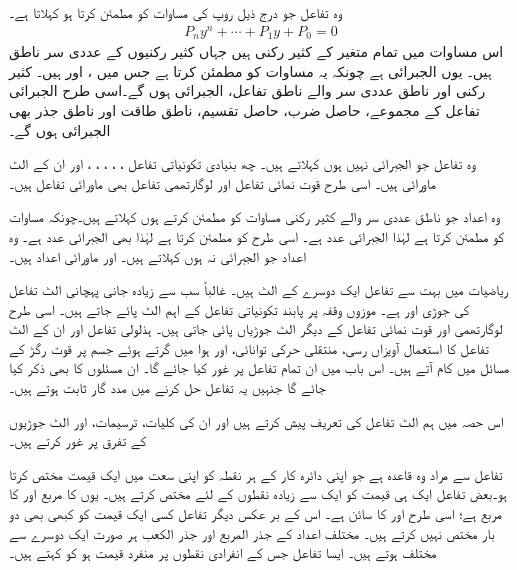 وہ تفاعل  جو درج ذیل روپ کی مساوات کو مطمئن کرتا ہو  کہلاتا ہے۔
\begin{align*}
P_ny^n+\cdots+P_1y+P_0=0
\end{align*}
اس مساوات میں تمام  متغیر  کے کثیر رکنی ہیں جہاں کثیر رکنیوں کے عددی سر ناطق ہیں۔ یوں  الجبرائی ہے چونکہ یہ مساوات  کو مطمئن کرتا ہے جس میں ،  اور  ہیں۔ کثیر رکنی اور ناطق عددی سر والے ناطق تفاعل، الجبرائی ہوں گے۔اسی طرح الجبرائی تفاعل کے مجموعے، حاصل ضرب، حاصل تقسیم، ناطق طاقت اور ناطق جذر بھی الجبرائی ہوں گے۔

وہ تفاعل جو الجبرائی نہیں ہوں  کہلاتے ہیں۔ چھ بنیادی تکونیاتی تفاعل ، ، ، ، ،  اور ان کے الٹ ماورائی ہیں۔ اسی طرح قوت نمائی تفاعل اور لوگارتھمی تفاعل بھی ماورائی تفاعل ہیں۔

وہ اعداد جو ناطق عددی سر والے کثیر رکنی مساوات کو مطمئن کرتے ہوں  کہلاتے ہیں۔چونکہ  مساوات  کو مطمئن کرتا ہے لہٰذا  الجبرائی عدد ہے۔ اسی طرح  کو  مطمئن کرتا ہے لہٰذا  بھی الجبرائی عدد ہے۔ وہ اعداد جو الجبرائی نہ ہوں  کہلاتے ہیں۔  اور  ماورائی اعداد ہیں۔

  ریاضیات میں بہت سے تفاعل ایک دوسرے کے الٹ ہیں۔ غالباً سب سے زیادہ جانی پہچانی الٹ تفاعل کی جوڑی  اور  ہے۔ موزوں وقفہ پر پابند تکونیاتی تفاعل کے اہم الٹ پائے  جاتے ہیں۔ اسی طرح  لوگارتھمی اور قوت نمائی تفاعل کے دیگر الٹ جوڑیاں پائی جاتی ہیں۔ ہذلولی تفاعل اور ان کے الٹ تفاعل کا استعمال آویزاں رسی، منتقلی حرکی توانائی، اور ہوا میں گرتے ہوئے جسم پر قوت رگڑ کے مسائل میں کام آتے ہیں۔ اس باب میں ان تمام تفاعل پر غور کیا جائے گا۔ ان مسئلوں کا بھی ذکر کیا جائے گا جنہیں یہ تفاعل حل کرنے میں مدد گار ثابت ہوتے ہیں۔

اس حصہ میں ہم الٹ تفاعل کی تعریف پیش کرتے ہیں اور ان کی کلیات، ترسیمات، اور الٹ جوڑیوں کے تفرق پر غور کرتے ہیں۔

تفاعل سے مراد وہ قاعدہ ہے جو اپنی دائرہ کار کے ہر نقطہ کو اپنی سعت میں ایک قیمت مختص کرتا ہو۔بعض تفاعل ایک ہی قیمت کو ایک سے زیادہ  نقطوں  کے لئے مختص کرتے ہیں۔ یوں  کا مربع اور  کا مربع  ہے؛ اسی طرح  اور  کا سائن  ہے۔ اس کے بر عکس دیگر تفاعل کسی ایک قیمت کو کبھی بھی دو بار مختص نہیں کرتے ہیں۔ مختلف اعداد کے جذر المربع اور جذر الکعب ہر صورت ایک دوسرے سے مختلف ہوتے ہیں۔ ایسا تفاعل جس کے انفرادی نقطوں پر منفرد قیمت ہو کو  کہتے ہیں۔

